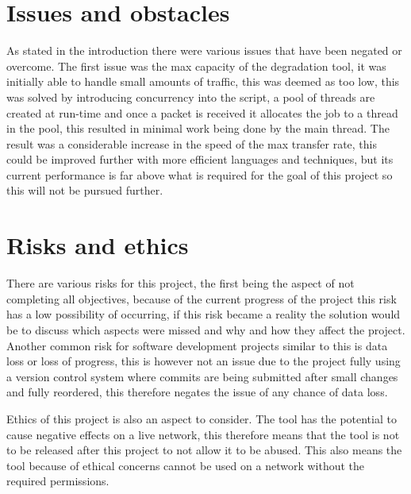 \section{Issues and obstacles}
As stated in the introduction there were various issues that have been negated or overcome. The first issue was the max capacity of the degradation tool, it was initially able to handle small amounts of traffic, this was deemed as too low, this was solved by introducing concurrency into the script, a pool of threads are created at run-time and once a packet is received it allocates the job to a thread in the pool, this resulted in minimal work being done by the main thread. The result was a considerable increase in the speed of the max transfer rate, this could be improved further with more efficient languages and techniques, but its current performance is far above what is required for the goal of this project so this will not be pursued further.

\section{Risks and ethics}
There are various risks for this project, the first being the aspect of not completing all objectives, because of the current progress of the project this risk has a low possibility of occurring, if this risk became a reality the solution would be to discuss which aspects were missed and why and how they affect the project. Another common risk for software development projects similar to this is data loss or loss of progress, this is however not an issue due to the project fully using a version control system where commits are being submitted after small changes and fully reordered, this therefore negates the issue of any chance of data loss.

Ethics of this project is also an aspect to consider. The tool has the potential to cause negative effects on a live network, this therefore means that the tool is not to be released after this project to not allow it to be abused. This also means the tool because of ethical concerns cannot be used on a network without the required permissions.

%


